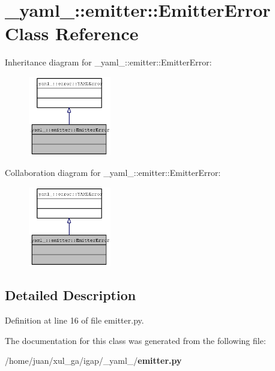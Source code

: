 \section{\_\-yaml\_\-::emitter::EmitterError Class Reference}
\label{class__yaml___1_1emitter_1_1EmitterError}
Inheritance diagram for \_\-yaml\_\-::emitter::EmitterError:\nopagebreak
\begin{figure}[H]
\begin{center}
\leavevmode
\includegraphics[width=102pt]{class__yaml___1_1emitter_1_1EmitterError__inherit__graph}
\end{center}
\end{figure}
Collaboration diagram for \_\-yaml\_\-::emitter::EmitterError:\nopagebreak
\begin{figure}[H]
\begin{center}
\leavevmode
\includegraphics[width=102pt]{class__yaml___1_1emitter_1_1EmitterError__coll__graph}
\end{center}
\end{figure}


\subsection{Detailed Description}


Definition at line 16 of file emitter.py.

The documentation for this class was generated from the following file:\begin{CompactItemize}
\item 
/home/juan/xul\_\-ga/igap/\_\-yaml\_\-/{\bf emitter.py}\end{CompactItemize}
